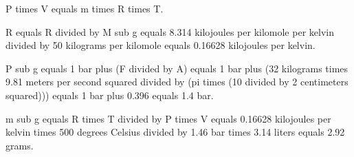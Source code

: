 P times V equals m times R times T.  

R equals R divided by M sub g equals 8.314 kilojoules per kilomole per kelvin divided by 50 kilograms per kilomole equals 0.16628 kilojoules per kelvin.  

P sub g equals 1 bar plus (F divided by A) equals 1 bar plus (32 kilograms times 9.81 meters per second squared divided by (pi times (10 divided by 2 centimeters squared))) equals 1 bar plus 0.396 equals 1.4 bar.  

m sub g equals R times T divided by P times V equals 0.16628 kilojoules per kelvin times 500 degrees Celsius divided by 1.46 bar times 3.14 liters equals 2.92 grams.